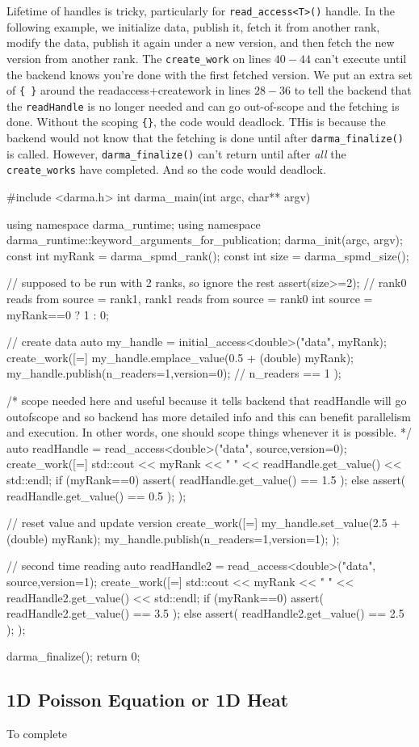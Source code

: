 Lifetime of handles is tricky, particularly for \texttt{read\_access<T>()} handle.  
In the following example, we initialize data, publish it, fetch it from another rank, 
modify the data, publish it again under a new version, and then fetch the new version from another rank. 
The \texttt{create\_work} on lines $40-44$ can't execute until the backend knows you're done with the first fetched version. 
We put an extra set of \texttt{\{ \}} around the readaccess+creatework in lines $28-36$ to tell the backend that 
the \texttt{readHandle} is no longer needed and can go out-of-scope and the fetching is done.  
Without the scoping \texttt{\{\}}, the code would deadlock. THis is because the backend would not know that 
the fetching is done until after \texttt{darma\_finalize()} is called. However, \texttt{darma\_finalize()} 
can't return until after {\it all} the \texttt{create\_works} have completed.  And so the code would deadlock. 


\begin{CppCodeNumb}
#include <darma.h>
int darma_main(int argc, char** argv)
{
  using namespace darma_runtime; 
  using namespace darma_runtime::keyword_arguments_for_publication;
  darma_init(argc, argv);
  const int myRank = darma_spmd_rank();
  const int size = darma_spmd_size();

  // supposed to be run with 2 ranks, so ignore the rest
  assert(size>=2);
  // rank0 reads from source = rank1, rank1 reads from source = rank0 
  int source = myRank==0 ? 1 : 0;

  // create data
  auto my_handle = initial_access<double>("data", myRank);
  create_work([=]
  {
    my_handle.emplace_value(0.5 + (double) myRank);
    my_handle.publish(n_readers=1,version=0); // n_readers == 1
  });

  /* scope {} needed here and useful because it tells backend that 
     readHandle will go outofscope and so backend has more detailed 
     info and this can benefit parallelism and execution. 
     In other words, one should scope things whenever it is possible. */ 
  {
    auto readHandle = read_access<double>("data", source,version=0);
    create_work([=]
    {
      std::cout << myRank << " " << readHandle.get_value() << std::endl;
      if (myRank==0)
        assert( readHandle.get_value() == 1.5 );
      else
        assert( readHandle.get_value() == 0.5 );
    });
  }

  // reset value and update version
  create_work([=]
  {
    my_handle.set_value(2.5 + (double) myRank);
    my_handle.publish(n_readers=1,version=1);
  });

  // second time reading
  auto readHandle2 = read_access<double>("data", source,version=1);
  create_work([=]
  {
    std::cout << myRank << " " << readHandle2.get_value() << std::endl;
    if (myRank==0)
      assert( readHandle2.get_value() == 3.5 );
    else
      assert( readHandle2.get_value() == 2.5 );
  });

  darma_finalize();
  return 0;
}
\end{CppCodeNumb}





\subsection{1D Poisson Equation or 1D Heat}

To complete





